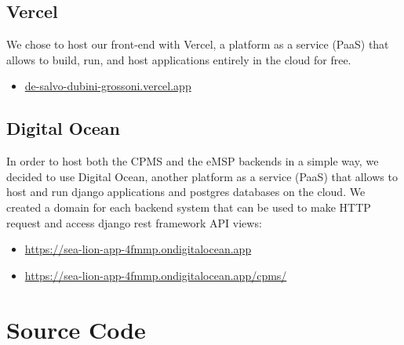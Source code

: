 \documentclass[table, 12pt]{article}
\begin{document}
\subsection{Vercel}
We chose to host our front-end with Vercel, a platform as a service (PaaS) that allows
to build, run, and host applications entirely in the cloud for free.
\begin{itemize}
    \item \url{de-salvo-dubini-grossoni.vercel.app}
\end{itemize}


\subsection{Digital Ocean}
In order to host both the CPMS and the eMSP backends in a simple way, we decided to 
use Digital Ocean, another platform as a service (PaaS) that allows to host and run django applications and postgres databases on the cloud.
We created a domain for each backend system that can be used to make HTTP request and access django rest framework API views:
\begin{itemize}
    \item \url{https://sea-lion-app-4fmmp.ondigitalocean.app}
    \item \url{https://sea-lion-app-4fmmp.ondigitalocean.app/cpms/}
\end{itemize}

\section{Source Code}
\end{document}
